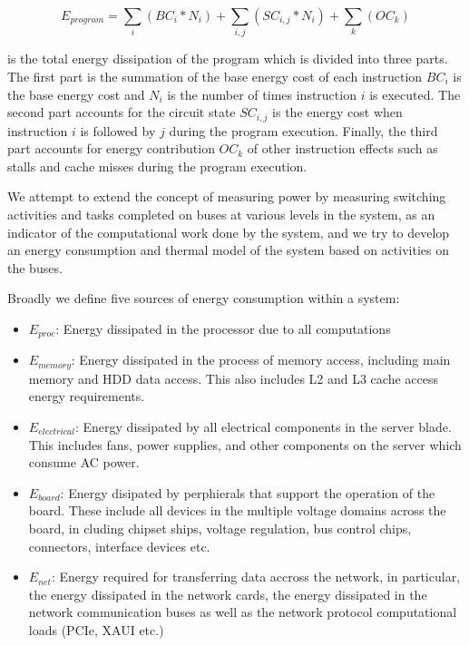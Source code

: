 \documentclass[times, 10pt,onecolumn]{article}
\begin{document}
\begin{equation}
\label{eq:power_prog}
E_{program}=  \sum_i (BC_i*N_i) + \sum_{i,j} (SC_{i,j}*N_i) + \sum_k (OC_k)
\end{equation}
 
is the total energy dissipation of the program which is divided into
three parts. The first part is the summation of the base energy cost of
each instruction $BC_i$ is the base energy cost and $N_i$ is the number
of times instruction $i$ is executed. The second part accounts for the
circuit state $SC_{i,j}$ is the energy cost when instruction $i$ is
followed by $j$ during the program execution. Finally, the third part
accounts for energy contribution $OC_k$ of other instruction effects
such as stalls and cache misses during the program execution.
 
We attempt to extend the concept of measuring power by measuring
switching activities and tasks completed on buses at various levels in
the system, as an indicator of the computational work done by the
system, and we try to develop an energy consumption and thermal model of
the system based on activities on the buses.

Broadly we define five sources of energy consumption within a system:
\begin{itemize}
\item $E_{proc}$: Energy dissipated in the processor due to all
  computations
\item $E_{memory}$: Energy dissipated in the process of memory access,
  including main memory and HDD data access. This also includes L2 and
  L3 cache access energy requirements.
\item $E_{electrical}$: Energy dissipated by all electrical components
  in the server blade. This includes fans, power supplies, and other
  components on the server which consume AC power.
\item $E_{board}$: Energy disipated by perphierals that support the
  operation of the board. These include all devices in the multiple
  voltage domains across the board, in cluding chipset ships, voltage
  regulation, bus control chips, connectors, interface devices etc.
\item $E_{net}$: Energy required for transferring data accross the
  network, in particular, the energy dissipated in the network cards,
  the energy dissipated in the network communication buses as well as
  the network protocol computational loads (PCIe, XAUI etc.)
\end{itemize}
\end{document}
